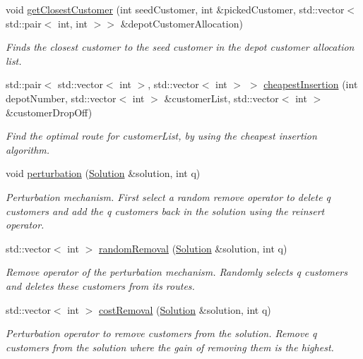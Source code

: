 \begin{DoxyCompactItemize}
void \hyperlink{class_solver_aa00079f9f5ce6d19af4ecff16d8764ad}{get\+Closest\+Customer} (int seed\+Customer, int \&picked\+Customer, std\+::vector$<$ std\+::pair$<$ int, int $>$$>$ \&depot\+Customer\+Allocation)
\begin{DoxyCompactList}\small\item\em Finds the closest customer to the seed customer in the depot customer allocation list. \end{DoxyCompactList}\item 
std\+::pair$<$ std\+::vector$<$ int $>$, std\+::vector$<$ int $>$ $>$ \hyperlink{class_solver_a47e3f4f776b1a27071b0e7a3648de839}{cheapest\+Insertion} (int depot\+Number, std\+::vector$<$ int $>$ \&customer\+List, std\+::vector$<$ int $>$ \&customer\+Drop\+Off)
\begin{DoxyCompactList}\small\item\em Find the optimal route for customer\+List, by using the cheapest insertion algorithm. \end{DoxyCompactList}\item 
void \hyperlink{class_solver_ac4c890c0725d91f8936201bfb57f924c}{perturbation} (\hyperlink{class_solution}{Solution} \&solution, int q)
\begin{DoxyCompactList}\small\item\em Perturbation mechanism. First select a random remove operator to delete q customers and add the q customers back in the solution using the reinsert operator. \end{DoxyCompactList}\item 
std\+::vector$<$ int $>$ \hyperlink{class_solver_aac5e62758bb4cd6f35fec178ab7aafd3}{random\+Removal} (\hyperlink{class_solution}{Solution} \&solution, int q)
\begin{DoxyCompactList}\small\item\em Remove operator of the perturbation mechanism. Randomly selects q customers and deletes these customers from its routes. \end{DoxyCompactList}\item 
std\+::vector$<$ int $>$ \hyperlink{class_solver_a97a087718f18b4c16da0cc67dab4e01a}{cost\+Removal} (\hyperlink{class_solution}{Solution} \&solution, int q)
\begin{DoxyCompactList}\small\item\em Perturbation operator to remove customers from the solution. Remove q customers from the solution where the gain of removing them is the highest. \end{DoxyCompactList}\item 
$$
\end{DoxyCompactItemize}
